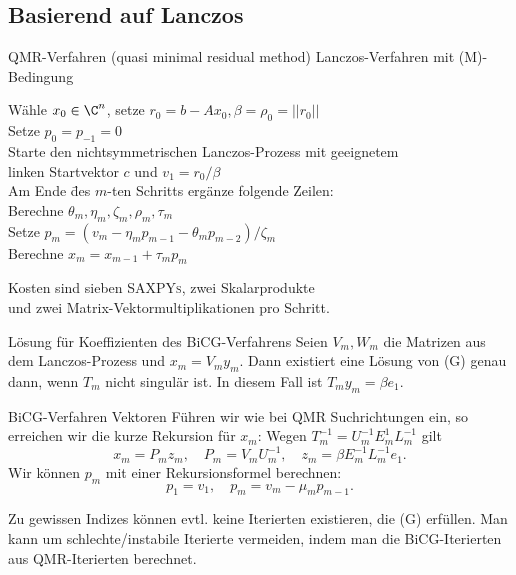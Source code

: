 \subsection{Basierend auf Lanczos}

\begin{karte}{QMR-Verfahren (quasi minimal residual method)}
    Lanczos-Verfahren mit (M)-Bedingung
    \begin{tabbing}
        Wähle \( x_0 \in \C^n \), setze \(r_0 = b - A x_0, \beta = \rho_0 = ||r_0||\) \\
        Setze \( p_0 = p_{-1} = 0 \)  \\
        Starte den nichtsymmetrischen Lanczos-Prozess mit geeignetem \\
        linken Startvektor \(c\) und \(v_1 = r_0/\beta\) \\
        Am Ende \= des \(m\)-ten Schritts ergänze folgende Zeilen:\\
        \> Berechne \( \theta_m, \eta_m, \zeta_m, \rho_m, \tau_m \) \\
        \> Setze \( p_m = (v_m - \eta_m p_{m-1} - \theta_m p_{m-2})/\zeta_m \) \\
        \> Berechne \( x_m = x_{m-1} + \tau_m p_m \)
    \end{tabbing}
    Kosten sind sieben \textsc{SAXPYs}, zwei Skalarprodukte \\
    und zwei Matrix-Vektormultiplikationen pro Schritt.
\end{karte}

\begin{karte}{Lösung für Koeffizienten des BiCG-Verfahrens}
    Seien \(V_m, W_m\) die Matrizen aus dem Lanczos-Prozess 
    und \(x_m = V_m y_m\). Dann existiert eine Lösung von (G) 
    genau dann, wenn \(T_m\) nicht singulär ist. In diesem Fall ist 
    \(T_m y_m = \beta e_1\).
\end{karte}

\begin{karte}{BiCG-Verfahren Vektoren}
    Führen wir wie bei QMR Suchrichtungen ein, so erreichen wir die 
    kurze Rekursion für \(x_m\): Wegen \( T_m^{-1} = U_m^{-1} E_m^{1} L_m^{-1} \) gilt 
    \[ x_m = P_m z_m, \quad P_m = V_m U_m^{-1}, \quad z_m = \beta E_m^{-1} L_m^{-1} e_1. \]
    Wir können \(p_m\) mit einer Rekursionsformel berechnen: 
    \[ p_1 = v_1, \quad p_m = v_m - \mu_m p_{m-1}.\]

    Zu gewissen Indizes können evtl. keine Iterierten existieren, die (G) 
    erfüllen. Man kann um schlechte/instabile Iterierte vermeiden, 
    indem man die BiCG-Iterierten aus QMR-Iterierten berechnet. 
\end{karte}

